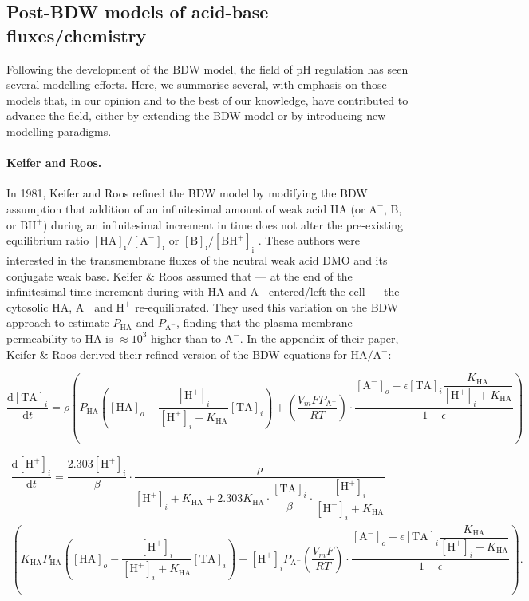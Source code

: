 \documentclass[fleqn,10pt]{physiome}
\begin{document}
\subsection{Post-BDW models of acid-base fluxes/chemistry}

Following the development of the BDW model, the field of $\mathrm{pH}$ regulation has seen several modelling efforts. Here, we summarise several, with emphasis on those models that, in our opinion and to the best of our knowledge, have contributed to advance the field, either by extending the BDW model or by introducing new modelling paradigms.\\

\paragraph{Keifer and Roos.} In 1981, Keifer and Roos refined the BDW model by modifying the BDW assumption that addition of an infinitesimal amount of weak acid $\mathrm{HA}$ (or $\mathrm{A^-}$, $\mathrm{B}$, or $\mathrm{BH^+}$) during an infinitesimal increment in time does not alter the pre-existing equilibrium ratio $\mathrm{[HA]_i/[A^-]_i}$ or $\mathrm{[B]_i/[BH^+]_i}$ \citep{keifer1981membrane}. These authors were interested in the transmembrane fluxes of the neutral weak acid DMO and its conjugate weak base. Keifer \& Roos assumed that --- at the end of the infinitesimal time increment during with $\mathrm{HA}$ and $\mathrm{A^-}$ entered/left the cell --- the cytosolic $\mathrm{HA}$, $\mathrm{A^-}$ and $\mathrm{H^+}$ re-equilibrated. They used this variation on the BDW approach to estimate $P_\mathrm{HA}$ and $P_\mathrm{A^-}$, finding that the plasma membrane permeability to $\mathrm{HA}$ is $\approx 10^3$ higher than to $\mathrm{A^-}$. In the appendix of their paper, Keifer \& Roos derived their refined version of the BDW equations for $\mathrm{HA}/\mathrm{A^-}$:

\begin{equation*}
\dfrac{\mathrm{d[TA]}_i}{\mathrm{d}t}=\rho\left(P_\mathrm{HA}\left( \mathrm{[HA]}_o-\dfrac{\mathrm{[H^+]}_i}{\mathrm{[H^+]}_i+K_\mathrm{HA}}\mathrm{[TA]}_i \right)+\left(\dfrac{V_mFP_\mathrm{A^-}}{RT}\right)\cdot\dfrac{\mathrm{[A^-]}_o-\epsilon\mathrm{[TA]}_i\dfrac{K_\mathrm{HA}}{\mathrm{[H^+]}_i+K_\mathrm{HA}}}{1-\epsilon} \right)
\label{eqn:keifer}
\end{equation*}

\begin{multline*}
\dfrac{\mathrm{d[H^+]}_i}{\mathrm{d}t}=\dfrac{2.303\mathrm{[H^+]}_i}{\beta}\cdot \dfrac{\rho}{\mathrm{[H^+]}_i+K_\mathrm{HA}+2.303K_\mathrm{HA}\cdot \dfrac{\mathrm{[TA]}_i}{\beta}\cdot \dfrac{\mathrm{[H^+]}_i}{\mathrm{[H^+]}_i+K_\mathrm{HA}}}\\\left(K_\mathrm{HA} P_\mathrm{HA}\left(\mathrm{[HA]}_o-\dfrac{\mathrm{[H^+]}_i}{\mathrm{[H^+]}_i+K_\mathrm{HA}}\mathrm{[TA]}_i \right)-\mathrm{[H^+]}_i P_\mathrm{A^-}\left(\dfrac{V_mF}{RT}\right)\cdot\dfrac{\mathrm{[A^-]}_o-\epsilon\mathrm{[TA]}_i\dfrac{K_\mathrm{HA}}{\mathrm{[H^+]}_i+K_\mathrm{HA}}}{1-\epsilon} \right).
\label{eqn:keifer2}
\end{multline*}
\end{document}
